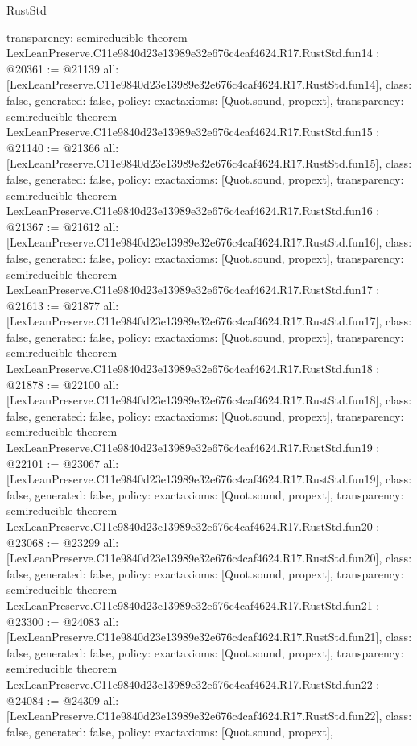 \begin{lexlean}{RustStd}
\begin{coremodule}
{  transparency: semireducible
}
theorem LexLeanPreserve.C11e9840d23e13989e32e676c4caf4624.R17.RustStd.fun14 : @20361 := @21139 {
  all: [LexLeanPreserve.C11e9840d23e13989e32e676c4caf4624.R17.RustStd.fun14],
  class: false,
  generated: false,
  policy: exact{axioms: [Quot.sound, propext]},
  transparency: semireducible
}
theorem LexLeanPreserve.C11e9840d23e13989e32e676c4caf4624.R17.RustStd.fun15 : @21140 := @21366 {
  all: [LexLeanPreserve.C11e9840d23e13989e32e676c4caf4624.R17.RustStd.fun15],
  class: false,
  generated: false,
  policy: exact{axioms: [Quot.sound, propext]},
  transparency: semireducible
}
theorem LexLeanPreserve.C11e9840d23e13989e32e676c4caf4624.R17.RustStd.fun16 : @21367 := @21612 {
  all: [LexLeanPreserve.C11e9840d23e13989e32e676c4caf4624.R17.RustStd.fun16],
  class: false,
  generated: false,
  policy: exact{axioms: [Quot.sound, propext]},
  transparency: semireducible
}
theorem LexLeanPreserve.C11e9840d23e13989e32e676c4caf4624.R17.RustStd.fun17 : @21613 := @21877 {
  all: [LexLeanPreserve.C11e9840d23e13989e32e676c4caf4624.R17.RustStd.fun17],
  class: false,
  generated: false,
  policy: exact{axioms: [Quot.sound, propext]},
  transparency: semireducible
}
theorem LexLeanPreserve.C11e9840d23e13989e32e676c4caf4624.R17.RustStd.fun18 : @21878 := @22100 {
  all: [LexLeanPreserve.C11e9840d23e13989e32e676c4caf4624.R17.RustStd.fun18],
  class: false,
  generated: false,
  policy: exact{axioms: [Quot.sound, propext]},
  transparency: semireducible
}
theorem LexLeanPreserve.C11e9840d23e13989e32e676c4caf4624.R17.RustStd.fun19 : @22101 := @23067 {
  all: [LexLeanPreserve.C11e9840d23e13989e32e676c4caf4624.R17.RustStd.fun19],
  class: false,
  generated: false,
  policy: exact{axioms: [Quot.sound, propext]},
  transparency: semireducible
}
theorem LexLeanPreserve.C11e9840d23e13989e32e676c4caf4624.R17.RustStd.fun20 : @23068 := @23299 {
  all: [LexLeanPreserve.C11e9840d23e13989e32e676c4caf4624.R17.RustStd.fun20],
  class: false,
  generated: false,
  policy: exact{axioms: [Quot.sound, propext]},
  transparency: semireducible
}
theorem LexLeanPreserve.C11e9840d23e13989e32e676c4caf4624.R17.RustStd.fun21 : @23300 := @24083 {
  all: [LexLeanPreserve.C11e9840d23e13989e32e676c4caf4624.R17.RustStd.fun21],
  class: false,
  generated: false,
  policy: exact{axioms: [Quot.sound, propext]},
  transparency: semireducible
}
theorem LexLeanPreserve.C11e9840d23e13989e32e676c4caf4624.R17.RustStd.fun22 : @24084 := @24309 {
  all: [LexLeanPreserve.C11e9840d23e13989e32e676c4caf4624.R17.RustStd.fun22],
  class: false,
  generated: false,
  policy: exact{axioms: [Quot.sound, propext]},
}
\end{coremodule}
\end{lexlean}
